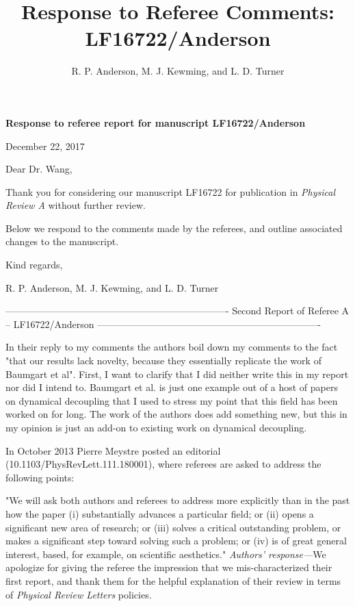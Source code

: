 \documentclass[letterpaper]{article}
\title{Response to Referee Comments: LF16722/Anderson}
\author{R. P. Anderson, M. J. Kewming, and L. D. Turner}
\newenvironment{refcomment}{\singlespacing\verbatim}{\endverbatim}
\newcommand{\response}{\emph{Authors' response---}}
\begin{document}

\textbf{Response to referee report for manuscript LF16722/Anderson}

December 22, 2017

Dear Dr. Wang,

Thank you for considering our manuscript LF16722 for publication in \textit{Physical Review A} without further review.

Below we respond to the comments made by the referees, and outline associated changes to the manuscript. 

Kind regards,

R. P. Anderson, M. J. Kewming, and L. D. Turner

\newpage
\begin{refcomment}
----------------------------------------------------------------------
Second Report of Referee A -- LF16722/Anderson
----------------------------------------------------------------------

In their reply to my comments the authors boil down my comments to the
fact "that our results lack novelty, because they
essentially replicate the work of Baumgart et al".
First, I want to clarify that I did neither write this in my report
nor did I intend to. Baumgart et al. is just one example out of a host
of papers on dynamical decoupling that I used to stress my point that
this field has been worked on for long. The work of the authors does
add something new, but this in my opinion is just an add-on to
existing work on dynamical decoupling.

In October 2013 Pierre Meystre posted an editorial
(10.1103/PhysRevLett.111.180001), where referees are asked to address
the following points:

"We will ask both authors and referees to address more explicitly than
in the past how the paper (i) substantially advances a particular
field; or (ii) opens a significant new area of research; or (iii)
solves a critical outstanding problem, or makes a significant step
toward solving such a problem; or (iv) is of great general interest,
based, for example, on scientific aesthetics."
\end{refcomment}
\response We apologize for giving the referee the impression that we mis-characterized their first report, and thank them for the helpful explanation of their review in terms of \textit{Physical Review Letters} policies.
\end{document}
